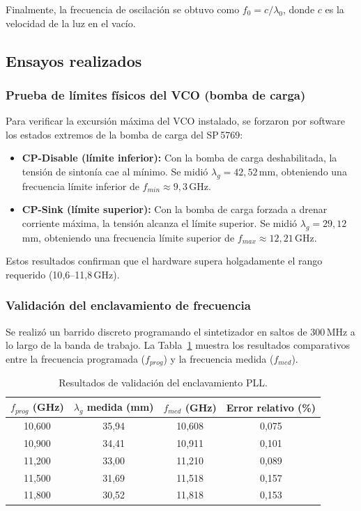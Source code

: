\documentclass[12pt, a4paper]{article}
\begin{document}
	Finalmente, la frecuencia de oscilación se obtuvo como $f_0 = c / \lambda_0$, donde $c$ es la velocidad
	de la luz en el vacío.
	
	\subsection{Ensayos realizados}
	
	\subsubsection{Prueba de límites físicos del VCO (bomba de carga)}
	
	Para verificar la excursión máxima del VCO instalado, se forzaron por software los estados extremos
	de la bomba de carga del SP\,5769:
	
	\begin{itemize}[leftmargin=*]
		\item \textbf{CP-Disable (límite inferior):} Con la bomba de carga deshabilitada, la tensión de
		sintonía cae al mínimo. Se midió $\lambda_g = 42{,}52$\,mm, obteniendo una frecuencia límite
		inferior de $f_{min} \approx 9{,}3$\,GHz.
		\item \textbf{CP-Sink (límite superior):} Con la bomba de carga forzada a drenar corriente máxima,
		la tensión alcanza el límite superior. Se midió $\lambda_g = 29{,}12$\,mm, obteniendo una
		frecuencia límite superior de $f_{max} \approx 12{,}21$\,GHz.
	\end{itemize}
	
	Estos resultados confirman que el hardware supera holgadamente el rango requerido (10{,}6–11{,}8\,GHz).
	
	\subsubsection{Validación del enclavamiento de frecuencia}
	
	Se realizó un barrido discreto programando el sintetizador en saltos de 300\,MHz a lo largo de la banda
	de trabajo. La Tabla~\ref{tab:resultados} muestra los resultados comparativos entre la frecuencia
	programada ($f_{prog}$) y la frecuencia medida ($f_{med}$).
	
	\begin{table}[H]
		\centering
		\caption{Resultados de validación del enclavamiento PLL.}
		\label{tab:resultados}
		\renewcommand{\arraystretch}{1.3}
		\begin{tabular}{cccc}
			\toprule
			$f_{prog}$ (GHz) & $\lambda_g$ medida (mm) & $f_{med}$ (GHz) & Error relativo (\%) \\
			\midrule
			10{,}600 & 35{,}94 & 10{,}608 & 0{,}075 \\
			10{,}900 & 34{,}41 & 10{,}911 & 0{,}101 \\
			11{,}200 & 33{,}00 & 11{,}210 & 0{,}089 \\
			11{,}500 & 31{,}69 & 11{,}518 & 0{,}157 \\
			11{,}800 & 30{,}52 & 11{,}818 & 0{,}153 \\
			\bottomrule
		\end{tabular}
	\end{table}
	
\end{document}
